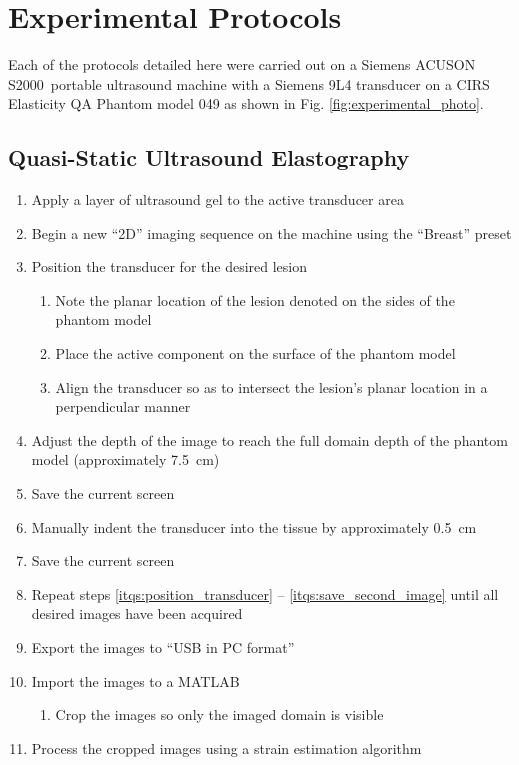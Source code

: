 \chapter{Experimental Protocols}
\label{app:experimental}
	\doublespacing
	Each of the protocols detailed here were carried out on a Siemens ACUSON S2000\textsuperscript{\texttrademark}\ portable ultrasound machine with a Siemens 9L4 transducer on a CIRS Elasticity QA Phantom model 049 as shown in Fig. \ref{fig:experimental_photo}.

	\begin{figure*}[!htb]
		\centering
		\caption[]{Experimental setup showing the ultrasound machine, probe, and phantom model.}
		\label{fig:experimental_photo}
	\end{figure*}

 	\singlespacing
	\section{Quasi-Static Ultrasound Elastography}
		\label{appsec:experimental_quasistatic}
		\begin{enumerate}
			\item Apply a layer of ultrasound gel to the active transducer area
			\item Begin a new ``2D'' imaging sequence on the machine using the ``Breast'' preset
			\item \label{itqs:position_transducer} Position the transducer for the desired lesion
			\begin{enumerate}
				\item Note the planar location of the lesion denoted on the sides of the phantom model
				\item Place the active component on the surface of the phantom model
				\item Align the transducer so as to intersect the lesion's planar location in a perpendicular manner
			\end{enumerate}
			\item Adjust the depth of the image to reach the full domain depth of the phantom model (approximately \SI{7.5}{\cm})
			\item Save the current screen
			\item Manually indent the transducer into the tissue by approximately \SI{0.5}{\cm}
			\item \label{itqs:save_second_image} Save the current screen
			\item Repeat steps \ref{itqs:position_transducer} -- \ref{itqs:save_second_image} until all desired images have been acquired
			\item Export the images to ``USB in PC format''
			\item Import the images to a MATLAB
			\begin{enumerate}
				\item Crop the images so only the imaged domain is visible
			\end{enumerate}
			\item Process the cropped images using a strain estimation algorithm
		\end{enumerate}

